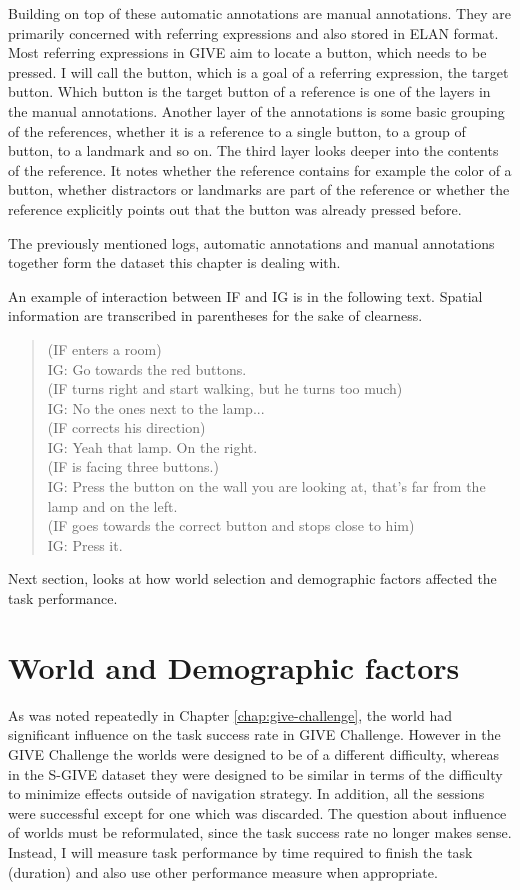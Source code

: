 Building on top of these automatic annotations are manual annotations. They are primarily concerned with referring expressions and also stored in ELAN format. Most referring expressions in GIVE aim to locate a button, which needs to be pressed. I will call the button, which is a goal of a referring expression, the target button. Which button is the target button of a reference is one of the layers in the manual annotations. Another layer of the annotations is some basic grouping of the references, whether it is a reference to a single button, to a group of button, to a landmark and so on. The third layer looks deeper into the contents of the reference. It notes whether the reference contains for example the color of a button, whether distractors or landmarks are part of the reference or whether the reference explicitly points out that the button was already pressed before.

The previously mentioned logs, automatic annotations and manual annotations together form the dataset this chapter is dealing with.

An example of interaction between IF and IG is in the following text. Spatial information are transcribed in parentheses for the sake of clearness.

\begin{verse}
(IF enters a room)\\
IG: Go towards the red buttons.\\
(IF turns right and start walking, but he turns too much)\\
IG: No the ones next to the lamp...\\
(IF corrects his direction)\\
IG: Yeah that lamp. On the right.\\
(IF is facing three buttons.)\\
IG: Press the button on the wall you are looking at, that's far from the lamp and on the left. \\
(IF goes towards the correct button and stops close to him)\\
IG: Press it.\\
\end{verse}

Next section, looks at how world selection and demographic factors affected the task performance.

\section{World and Demographic factors}
\label{sec:world-demo-factors}
As was noted repeatedly in Chapter \ref{chap:give-challenge}, the world had significant influence on the task success rate in GIVE Challenge. However in the GIVE Challenge the worlds were designed to be of a different difficulty, whereas in the S-GIVE dataset they were designed to be similar in terms of the difficulty to minimize effects outside of navigation strategy. In addition, all the sessions were successful except for one which was discarded. The question about influence of worlds must be reformulated, since the task success rate no longer makes sense. Instead, I will measure task performance by time required to finish the task (duration) and also use other performance measure when appropriate.

